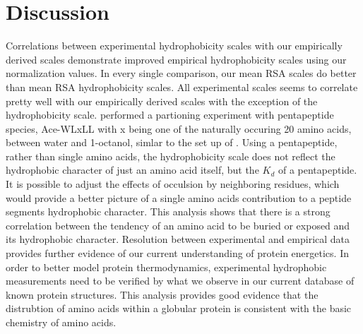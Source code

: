 \documentclass[12pt]{article}
\begin{document}
\section{Discussion}
Correlations between experimental hydrophobicity scales with our empirically derived scales demonstrate improved empirical hydrophobicity scales using our normalization values. In every single comparison, our mean RSA scales do better than \cite{Rose1985} mean RSA hydrophobicity scales. All experimental scales seems to correlate pretty well with our empirically derived scales with the exception of the \cite{Wimley} hydrophobicity scale. \cite{Wimley} performed a partioning experiment with pentapeptide species, Ace-WLxLL with x being one of the naturally occuring 20 amino acids, between water and 1-octanol, simlar to the set up of \cite{Fauchere1983}. Using a pentapeptide, rather than single amino acids, the \cite{Wimley} hydrophobicity scale does not reflect the hydrophobic character of just an amino acid itself, but the $K_d$ of a pentapeptide. It is possible to adjust the effects of occulsion by neighboring residues, which would provide a better picture of a single amino acids contribution to a peptide segments hydrophobic character. 
This analysis shows that there is a strong correlation between the tendency of an amino acid to be buried or exposed and its hydrophobic character. Resolution between experimental and empirical data provides further evidence of our current understanding of protein energetics. In order to better model protein thermodynamics, experimental hydrophobic measurements need to be verified by what we observe in our current database of known protein structures. This analysis provides good evidence that the distrubtion of amino acids within a globular protein is consistent with the basic chemistry of amino acids. 



\end{document}
